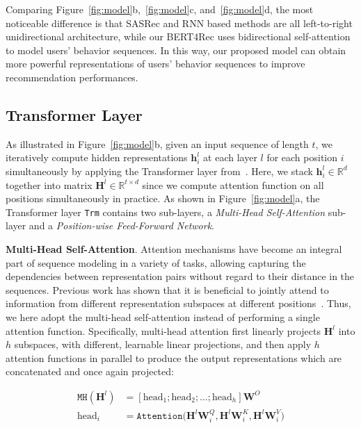 Comparing Figure~\ref{fig:model}b,~\ref{fig:model}c, and~\ref{fig:model}d, the most noticeable difference is that SASRec and RNN based methods are all left-to-right unidirectional architecture, while our BERT4Rec uses bidirectional self-attention to model users' behavior sequences. In this way, our proposed model can obtain more powerful representations of users' behavior sequences to improve  recommendation performances.

\subsection{Transformer Layer}

As illustrated in Figure~\ref{fig:model}b, given an input sequence of length $t$, we iteratively compute hidden representations $\bm{h}_i^{l}$ at each layer $l$ for each position $i$ simultaneously by applying the Transformer layer from~\cite{Vaswani:nips2017:Attention}. Here, we stack $\bm{h}_i^{l} \in \mathbb{R}^d$ together into matrix $\bm{H}^{l} {\in} \mathbb{R}^{t\times d}$ since we compute attention function on all positions simultaneously in practice. As shown in Figure~\ref{fig:model}a, the Transformer layer \texttt{Trm} contains two sub-layers, a \textit{Multi-Head Self-Attention} sub-layer and a \textit{Position-wise Feed-Forward Network}.

\textbf{Multi-Head Self-Attention}. Attention mechanisms have become an integral part of sequence modeling in a variety of tasks, allowing capturing the dependencies between representation pairs without regard to their distance in the sequences. Previous work has shown that it is beneficial to jointly attend to information from different representation subspaces at different positions~\cite{Vaswani:nips2017:Attention,Li:emnlp2018:Multi,Devlin:2018:BERT}. Thus, we here adopt the multi-head self-attention instead of performing a single attention function. Specifically, multi-head attention first linearly projects $\bm{H}^l$ into $h$ subspaces, with different, learnable linear projections, and then apply $h$ attention functions in parallel to produce the output representations which are concatenated and once again projected:

\begin{equation}
    \begin{aligned}
        \mathtt{MH}(\bm{H}^{l}) &= [\text{head}_1; \text{head}_2; \dots; \text{head}_h]\bm{W}^{O} \\
        \text{head}_i &= \mathtt{Attention}\bigl(\bm{H}^l\bm{W}_i^Q, \bm{H}^l\bm{W}_i^K, \bm{H}^l\bm{W}_i^V \bigr)
    \end{aligned}
\label{eq:mh}
\end{equation}

